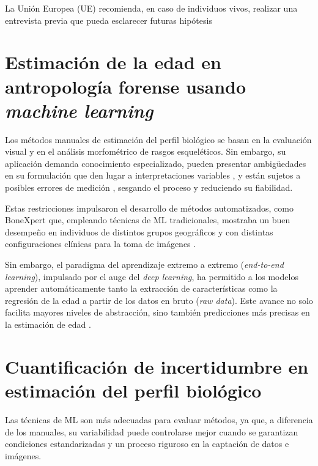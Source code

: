 La Unión Europea (UE) recomienda, en caso de individuos vivos, realizar una entrevista previa que pueda 
esclarecer futuras hipótesis



\section{Estimación de la edad en antropología forense usando \textit{machine learning}}

Los métodos manuales de estimación del perfil biológico se basan en la evaluación visual y en el análisis 
morfométrico de rasgos esqueléticos. Sin embargo, su aplicación demanda conocimiento especializado, pueden 
presentar ambigüedades en su formulación que den lugar a interpretaciones variables \cite{berst2001}, y están 
sujetos a posibles errores de medición \cite{langley2018}, sesgando el proceso y reduciendo su fiabilidad.

Estas restricciones impulsaron el desarrollo de métodos automatizados, como BoneXpert  
\cite{thodberg2008} que, empleando técnicas de ML tradicionales, mostraba un buen desempeño en individuos de 
distintos grupos geográficos y con distintas configuraciones clínicas para la toma de imágenes
\cite{van2009, martin2010, thodberg2010}.

Sin embargo, el paradigma del aprendizaje extremo a extremo (\textit{end-to-end learning}), impulsado por el
auge del \textit{deep learning}, ha permitido a los modelos aprender automáticamente tanto la extracción de 
características como la regresión de la edad a partir de los datos en bruto (\textit{raw data}). Este avance 
no solo facilita mayores niveles de abstracción, sino también predicciones más precisas en la estimación 
de edad \cite{kim2017, larson2018, lee2017}. 



\section{Cuantificación de incertidumbre en estimación del perfil biológico}

Las técnicas de ML son más adecuadas para evaluar métodos, ya que, a diferencia de los manuales, su 
variabilidad puede controlarse mejor cuando se garantizan condiciones estandarizadas y un proceso riguroso 
en la captación de datos e imágenes.


